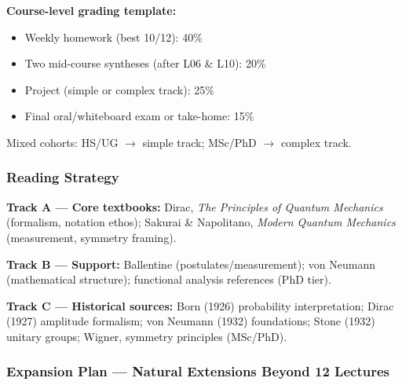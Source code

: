 \documentclass[11pt,a4paper]{article}
\begin{document}
\medskip
\noindent\textbf{Course-level grading template:}
\begin{itemize}[leftmargin=1.5em]
  \item Weekly homework (best 10/12): 40\%
  \item Two mid-course syntheses (after L06 \& L10): 20\%
  \item Project (simple or complex track): 25\%
  \item Final oral/whiteboard exam or take-home: 15\%
\end{itemize}
Mixed cohorts: HS/UG $\to$ simple track; MSc/PhD $\to$ complex track.

\subsubsection*{Reading Strategy}

\noindent\textbf{Track A --- Core textbooks:}
Dirac, \textit{The Principles of Quantum Mechanics} (formalism, notation ethos);
Sakurai \& Napolitano, \textit{Modern Quantum Mechanics} (measurement, symmetry framing).

\noindent\textbf{Track B --- Support:}
Ballentine (postulates/measurement);
von Neumann (mathematical structure);
functional analysis references (PhD tier).

\noindent\textbf{Track C --- Historical sources:}
Born (1926) probability interpretation;
Dirac (1927) amplitude formalism;
von Neumann (1932) foundations;
Stone (1932) unitary groups;
Wigner, symmetry principles (MSc/PhD).

\subsubsection*{Expansion Plan --- Natural Extensions Beyond 12 Lectures}
\end{document}
